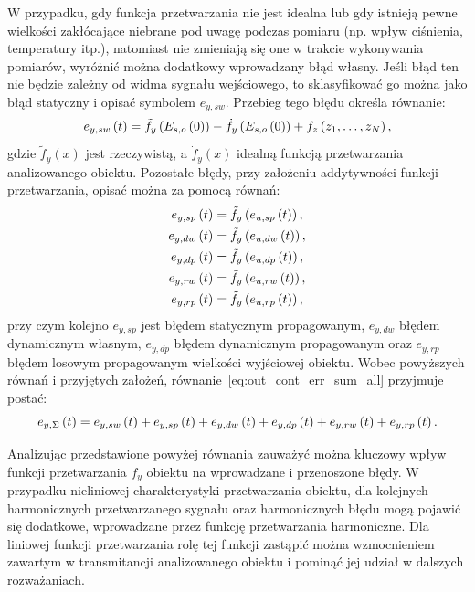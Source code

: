 W przypadku, gdy funkcja przetwarzania nie jest idealna lub gdy istnieją pewne wielkości zakłócające niebrane pod uwagę podczas pomiaru (np. wpływ ciśnienia, temperatury itp.), natomiast nie zmieniają się one w trakcie wykonywania pomiarów, wyróżnić można dodatkowy wprowadzany błąd własny. Jeśli błąd ten nie będzie zależny od widma sygnału wejściowego, to sklasyfikować go można jako błąd statyczny i opisać symbolem $e_{y,sw}$. Przebieg tego błędu określa równanie:
\begin{equation}
e_{y,sw} \left(t\right) = \tilde{f}_{y} \left( E_{s,o} \left(0\right) \right) - \dot{f}_{y} \left( E_{s,o} \left(0\right) \right) + f_{z} \left( z_{1}, \hdots, z_{N} \right) \label{eq:out_cont_err_stat_self},
\end{equation}
gdzie $\tilde{f}_{y}(x)$ jest rzeczywistą, a $\dot{f}_{y}(x)$ idealną funkcją przetwarzania analizowanego obiektu. Pozostałe błędy, przy założeniu addytywności funkcji przetwarzania, opisać można za pomocą równań:
\begin{gather}
e_{y,sp} \left(t\right) = \tilde{f}_{y} \left( e_{u,sp} \left(t\right) \right) \label{eq:out_cont_err_stat_prop}, \\
e_{y,dw} \left(t\right) = \tilde{f}_{y} \left( e_{u,dw} \left(t\right) \right) \label{eq:out_cont_err_dyn_prop}, \\
e_{y,dp} \left(t\right) = \tilde{f}_{y} \left( e_{u,dp} \left(t\right) \right) \label{eq:out_cont_err_dyn_self}, \\
e_{y,rw} \left(t\right) = \tilde{f}_{y} \left( e_{u,rw} \left(t\right) \right) \label{eq:out_cont_err_rand_self}, \\
e_{y,rp} \left(t\right) = \tilde{f}_{y} \left( e_{u,rp} \left(t\right) \right) \label{eq:out_cont_err_rand_prop},
\end{gather}
przy czym kolejno $e_{y,sp}$ jest błędem statycznym propagowanym, $e_{y,dw}$ błędem dynamicznym własnym, $e_{y,dp}$ błędem dynamicznym propagowanym oraz $e_{y,rp}$ błędem losowym propagowanym wielkości wyjściowej obiektu. Wobec powyższych równań i przyjętych założeń, równanie~\eqref{eq:out_cont_err_sum_all} przyjmuje postać:
\begin{equation}
e_{y,\Sigma} \left(t\right) = e_{y,sw} \left(t\right) + e_{y,sp} \left(t\right) + e_{y,dw} \left(t\right) + e_{y,dp} \left(t\right) + e_{y,rw} \left(t\right) + e_{y,rp} \left(t\right) \label{eq:out_cont_err_sum_add}.
\end{equation}

Analizując przedstawione powyżej równania zauważyć można kluczowy wpływ funkcji przetwarzania $f_{y}$ obiektu na wprowadzane i przenoszone błędy. W przypadku nieliniowej charakterystyki przetwarzania obiektu, dla kolejnych harmonicznych przetwarzanego sygnału oraz harmonicznych błędu mogą pojawić się dodatkowe, wprowadzane przez funkcję przetwarzania harmoniczne. Dla liniowej funkcji przetwarzania rolę tej funkcji zastąpić można wzmocnieniem zawartym w transmitancji analizowanego obiektu i pominąć jej udział w dalszych rozważaniach.

